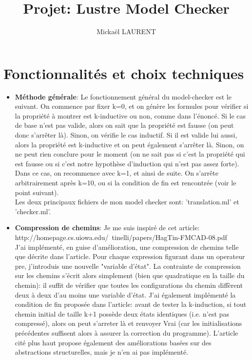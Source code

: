 \documentclass[a4paper]{article}%
\title{\vspace{1.5cm}Projet: Lustre Model Checker}
\author{Mickaël LAURENT}
\date{\vspace{-5ex}}
\begin{document}
    \maketitle

    \section{Fonctionnalités et choix techniques}
		
	\begin{itemize}
		\item \textbf{Méthode générale}: Le fonctionnement général du model-checker est le suivant.
		On commence par fixer k=0, et on génère les formules pour vérifier si la propriété à montrer est k-inductive ou non, comme dans l'énoncé.
		Si le cas de base n'est pas valide, alors on sait que la propriété est fausse (on peut donc s'arrêter là). Sinon, on vérifie le cas inductif.
		Si il est valide lui aussi, alors la propriété est k-inductive et on peut également s'arrêter là. Sinon, on ne peut rien conclure pour le moment
		(on ne sait pas si c'est la propriété qui est fausse ou si c'est notre hypothèse d'induction qui n'est pas assez forte). Dans ce cas, on recommence avec k=1, et ainsi de suite.
		On s'arrête arbitrairement après k=10, ou si la condition de fin est rencontrée (voir le point suivant).\\
		Les deux principaux fichiers de mon model checker sont: 'translation.ml' et 'checker.ml'.\\
		\item \textbf{Compression de chemins}: Je me suis inspiré de cet article:\\http://homepage.cs.uiowa.edu/~tinelli/papers/HagTin-FMCAD-08.pdf\\
		J'ai implémenté, en guise d'amélioration, une compression de chemins telle que décrite dans l'article.
		Pour chaque expression figurant dans un operateur pre, j'introduis une nouvelle "variable d'état".
		La contrainte de compression sur les chemins s'écrit alors simplement (bien que quadratique en la taille du chemin):
		il suffit de vérifier que toutes les configurations du chemin diffèrent deux à deux d'au moins une variable d'état.
		J'ai également implémenté la condition de fin proposée dans l'article: avant de tester la k-induction, si tout chemin initial de taille k+1 possède deux états identiques (i.e. n'est pas compressé),
		alors on peut s'arreter là et renvoyer Vrai (car les initialisations précédentes suffisent alors à assurer la correction du programme).
		L'article cité plus haut propose également des améliorations basées sur des abstractions structurelles, mais je n'en ai pas implémenté.\\

\end{itemize}
\end{document}
